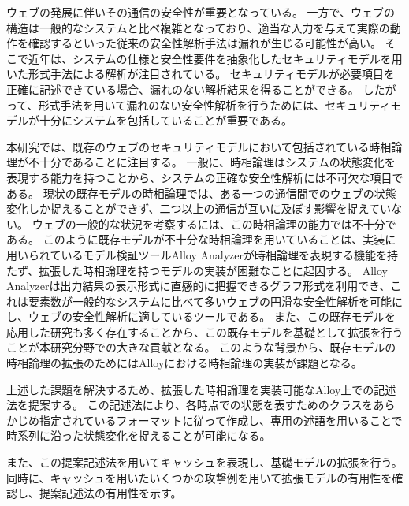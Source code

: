 \documentclass[12pt,a4paper]{jbook}
\begin{document}
ウェブの発展に伴いその通信の安全性が重要となっている。
一方で、ウェブの構造は一般的なシステムと比べ複雑となっており、適当な入力を与えて実際の動作を確認するといった従来の安全性解析手法は漏れが生じる可能性が高い。
そこで近年は、システムの仕様と安全性要件を抽象化したセキュリティモデルを用いた形式手法による解析が注目されている。
セキュリティモデルが必要項目を正確に記述できている場合、漏れのない解析結果を得ることができる。
したがって、形式手法を用いて漏れのない安全性解析を行うためには、セキュリティモデルが十分にシステムを包括していることが重要である。

\color{red}
本研究では、既存のウェブのセキュリティモデルにおいて包括されている時相論理が不十分であることに注目する。
一般に、時相論理はシステムの状態変化を表現する能力を持つことから、システムの正確な安全性解析には不可欠な項目である。
現状の既存モデルの時相論理では、ある一つの通信間でのウェブの状態変化しか捉えることができず、二つ以上の通信が互いに及ぼす影響を捉えていない。
ウェブの一般的な状況を考察するには、この時相論理の能力では不十分である。
このように既存モデルが不十分な時相論理を用いていることは、実装に用いられているモデル検証ツールAlloy Analyzerが時相論理を表現する機能を持たず、拡張した時相論理を持つモデルの実装が困難なことに起因する。
Alloy Analyzerは出力結果の表示形式に直感的に把握できるグラフ形式を利用でき、これは要素数が一般的なシステムに比べて多いウェブの円滑な安全性解析を可能にし、ウェブの安全性解析に適しているツールである。
また、この既存モデルを応用した研究も多く存在することから、この既存モデルを基礎として拡張を行うことが本研究分野での大きな貢献となる。
このような背景から、既存モデルの時相論理の拡張のためにはAlloyにおける時相論理の実装が課題となる。

上述した課題を解決するため、拡張した時相論理を実装可能なAlloy上での記述法を提案する。
この記述法により、各時点での状態を表すためのクラスをあらかじめ指定されているフォーマットに従って作成し、専用の述語を用いることで時系列に沿った状態変化を捉えることが可能になる。
\color{black}

また、この提案記述法を用いてキャッシュを表現し、基礎モデルの拡張を行う。
\color{red}
同時に、キャッシュを用いたいくつかの攻撃例を用いて拡張モデルの有用性を確認し、提案記述法の有用性を示す。
\color{black}
\end{document}
